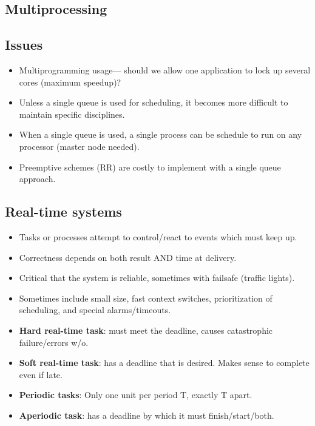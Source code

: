 \documentclass[fontsize=4.5pt]{scrartcl}
\begin{document}
\begin{multicols}{3}
  \section{Multiprocessing}
    \subsection{Issues}
      \begin{itemize}
        \item Multiprogramming usage--- should we allow one application to lock up several cores (maximum speedup)?
        \item Unless a single queue is used for scheduling, it becomes more difficult to maintain specific disciplines.
        \item When a single queue is used, a single process can be schedule to run on any processor (master node needed).
        \item Preemptive schemes (RR) are costly to implement with a single queue approach.
      \end{itemize}
     \subsection{Real-time systems}
       \begin{itemize}
         \item Tasks or processes attempt to control/react to events which must keep up.
         \item Correctness depends on both result AND time at delivery.
         \item Critical that the system is reliable, sometimes with failsafe (traffic lights).
         \item Sometimes include small size, fast context switches, prioritization of scheduling, and special alarms/timeouts.
         \item \textbf{Hard real-time task}: must meet the deadline, causes catastrophic failure/errors w/o.
         \item \textbf{Soft real-time task}: has a deadline that is desired. Makes sense to complete even if late.
         \item \textbf{Periodic tasks}: Only one unit per period T, exactly T apart.
         \item \textbf{Aperiodic task}: has a deadline by which it must finish/start/both.
       \end{itemize}

\end{multicols}
\end{document}
